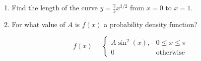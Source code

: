 \documentclass[12pt]{article}
\begin{document}
\begin{enumerate}
\item

Find the length of the curve $y=\frac{2}{3}x^{3/2}$ from $x=0$ to $x=1$.

\vspace{3in}
\item

For what value of $A$ is $f(x)$ a probability density function?

$$f(x) = \left\lbrace\begin{array}{cc}
A\sin^2(x), &  0\leq x \leq \pi\\
0 & \text{otherwise}\end{array}\right.$$

\end{enumerate}
\end{document}
